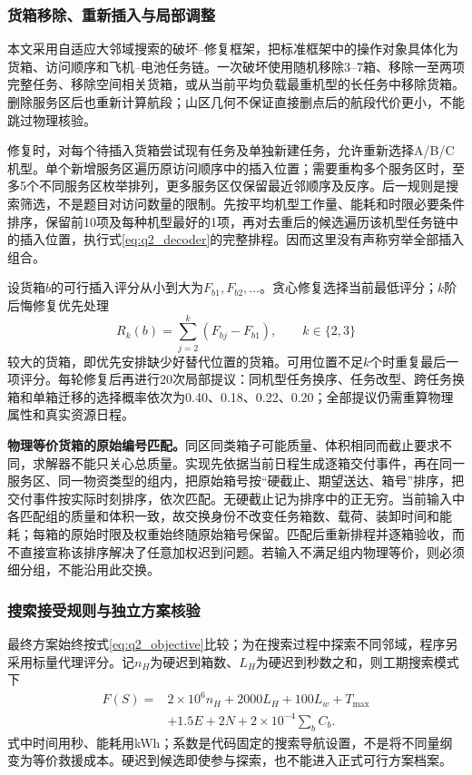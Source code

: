 \subsubsection{货箱移除、重新插入与局部调整}
本文采用自适应大邻域搜索的破坏--修复框架\cite{ropke2006alns}，把标准框架中的操作对象具体化为货箱、访问顺序和飞机--电池任务链。一次破坏使用随机移除3--7箱、移除一至两项完整任务、移除空间相关货箱，或从当前平均负载最重机型的长任务中移除货箱。删除服务区后也重新计算航段；山区几何不保证直接删点后的航段代价更小，不能跳过物理核验。

修复时，对每个待插入货箱尝试现有任务及单独新建任务，允许重新选择A/B/C机型。单个新增服务区遍历原访问顺序中的插入位置；需要重构多个服务区时，至多5个不同服务区枚举排列，更多服务区仅保留最近邻顺序及反序。后一规则是搜索筛选，不是题目对访问数量的限制。先按平均机型工作量、能耗和时限必要条件排序，保留前10项及每种机型最好的1项，再对去重后的候选遍历该机型任务链中的插入位置，执行式\eqref{eq:q2_decoder}的完整排程。因而这里没有声称穷举全部插入组合。

设货箱$b$的可行插入评分从小到大为$F_{b1},F_{b2},\ldots$。贪心修复选择当前最低评分；$k$阶后悔修复优先处理
\begin{equation}
 R_k(b)=\sum_{j=2}^{k}(F_{bj}-F_{b1}),\qquad k\in\{2,3\}
 \label{eq:q2_regret}
\end{equation}
较大的货箱，即优先安排缺少好替代位置的货箱。可用位置不足$k$个时重复最后一项评分。每轮修复后再进行20次局部提议：同机型任务换序、任务改型、跨任务换箱和单箱迁移的选择概率依次为0.40、0.18、0.22、0.20；全部提议仍需重算物理属性和真实资源日程。

\textbf{物理等价货箱的原始编号匹配。}同区同类箱子可能质量、体积相同而截止要求不同，求解器不能只关心总质量。实现先依据当前日程生成逐箱交付事件，再在同一服务区、同一物资类型的组内，把原始箱号按“硬截止、期望送达、箱号”排序，把交付事件按实际时刻排序，依次匹配。无硬截止记为排序中的正无穷。当前输入中各匹配组的质量和体积一致，故交换身份不改变任务箱数、载荷、装卸时间和能耗；每箱的原始时限及权重始终随原始箱号保留。匹配后重新排程并逐箱验收，而不直接宣称该排序解决了任意加权迟到问题。若输入不满足组内物理等价，则必须细分组，不能沿用此交换。

\subsubsection{搜索接受规则与独立方案核验}
最终方案始终按式\eqref{eq:q2_objective}比较；为在搜索过程中探索不同邻域，程序另采用标量代理评分。记$n_H$为硬迟到箱数、$L_H$为硬迟到秒数之和，则工期搜索模式下
\begin{equation}
\begin{split}
 F(S)={}&2\times10^6n_H+2000L_H+100L_w+T_{\max}\\
        &+1.5E+2N+2\times10^{-4}\sum_bC_b .
\end{split}
\label{eq:q2_search_score}
\end{equation}
式中时间用秒、能耗用kWh；系数是代码固定的搜索导航设置，不是将不同量纲变为等价救援成本。硬迟到候选即使参与探索，也不能进入正式可行方案档案。

